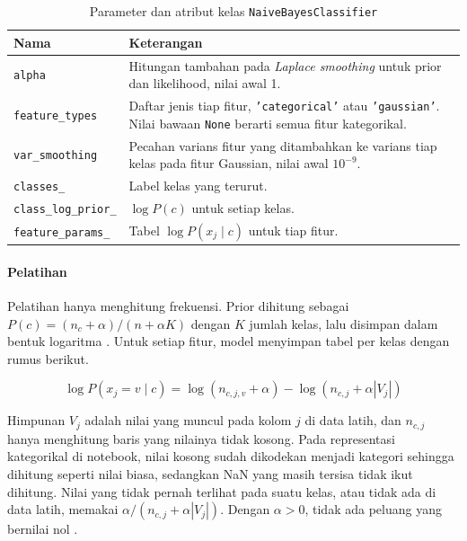 \begin{table}[H]
    \centering
    \small
    \renewcommand{\arraystretch}{1.2}
    \begin{tabularx}{\textwidth}{@{}lX@{}}
        \toprule
        \textbf{Nama} & \textbf{Keterangan} \\
        \midrule
        \texttt{alpha} & Hitungan tambahan pada \textit{Laplace smoothing} untuk prior dan likelihood, nilai awal 1. \\
        \texttt{feature\_types} & Daftar jenis tiap fitur, \texttt{'categorical'} atau \texttt{'gaussian'}. Nilai bawaan \texttt{None} berarti semua fitur kategorikal. \\
        \texttt{var\_smoothing} & Pecahan varians fitur yang ditambahkan ke varians tiap kelas pada fitur Gaussian, nilai awal $10^{-9}$. \\
        \texttt{classes\_} & Label kelas yang terurut. \\
        \texttt{class\_log\_prior\_} & $\log P(c)$ untuk setiap kelas. \\
        \texttt{feature\_params\_} & Tabel $\log P(x_j\mid c)$ untuk tiap fitur. \\
        \bottomrule
    \end{tabularx}
    \caption{Parameter dan atribut kelas \texttt{NaiveBayesClassifier}}
    \label{tab:nb-atribut}
\end{table}

\paragraph{Pelatihan}
Pelatihan hanya menghitung frekuensi. Prior dihitung sebagai $P(c)=(n_c+\alpha)/(n+\alpha K)$ dengan $K$ jumlah kelas, lalu disimpan dalam bentuk logaritma \cite{ref:materi-14}. Untuk setiap fitur, model menyimpan tabel per kelas dengan rumus berikut.

\[
\log P(x_j=v\mid c)=
\log\left(n_{c,j,v}+\alpha\right)-
\log\left(n_{c,j}+\alpha|V_j|\right)
\]

Himpunan $V_j$ adalah nilai yang muncul pada kolom $j$ di data latih, dan $n_{c,j}$ hanya menghitung baris yang nilainya tidak kosong. Pada representasi kategorikal di notebook, nilai kosong sudah dikodekan menjadi kategori sehingga dihitung seperti nilai biasa, sedangkan NaN yang masih tersisa tidak ikut dihitung. Nilai yang tidak pernah terlihat pada suatu kelas, atau tidak ada di data latih, memakai $\alpha/(n_{c,j}+\alpha|V_j|)$. Dengan $\alpha>0$, tidak ada peluang yang bernilai nol \cite{ref:materi-14, ref:manning-2008}.

